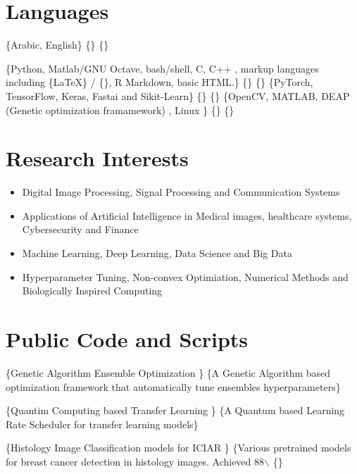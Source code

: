 \documentclass[letterpaper,10pt]{article}
\begin{document}
\chapter{Languages}
\label{sec:org588ed98}

	\{Arabic, English\}
	\{\}
	\{\}

	\{Python, Matlab/GNU Octave, bash/shell, C, C++ , markup languages including \{\LaTeX\} / \{\XeTeX\}, R Markdown, basic HTML.\}
	\{\}
	\{\}
	\{PyTorch, TensorFlow, Keras, Fastai and Sikit-Learn\}
	\{\}
	\{\}
	\{OpenCV, MATLAB, DEAP (Genetic optimization framamework) , Linux \}
	\{\}
	\{\}

\chapter{Research Interests}
\label{sec:org7a8fccd}

\begin{itemize}
\item Digital Image Processing, Signal Processing and Communication Systems
\item Applications of Artificial Intelligence in Medical images, healthcare systems, Cybersecurity and Finance
\item Machine Learning, Deep Learning, Data Science and Big Data
\item Hyperparameter Tuning, Non-convex Optimiation, Numerical Methods and Biologically Inspired Computing

\end{itemize}
\chapter{Public Code and Scripts}
\label{sec:orgfb78a58}

	\{Genetic Algorithm Ensemble Optimization \href{https://github.com/alkhaldieid/gae}{\gh}\}
	\{A Genetic Algorithm based optimization framework that automatically tune ensembles hyperparameters\}

	\{Quantim Computing based Transfer Learning \href{https://github.com/alkhaldieid/gpe}{\gh}\}
	\{A Quantum based Learning Rate Scheduler for transfer learning models\}

	\{Histology Image Classification models for ICIAR \href{https://github.com/alkhaldieid/iciar}{\gh}\}
	\{Various pretrained models for breast cancer detection in histology images. Achieved 88$\backslash$%
	\{\}
\end{document}
